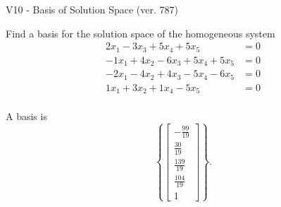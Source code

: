 \begin{exercise}
  \begin{exerciseTitle}V10 - Basis of Solution Space (ver. 787)\end{exerciseTitle}
  \begin{exerciseStatement}
    Find a basis for the solution space of the homogeneous system 
\begin{align*}
 2 x_ 1 -3 x_ 3 + 5 x_ 4 + 5 x_ 5 &= 0  \\ 
  -1 x_ 1 + 4 x_ 2 -6 x_ 3 + 5 x_ 4 + 5 x_ 5 &= 0  \\ 
  -2 x_ 1 -4 x_ 2 + 4 x_ 3 -5 x_ 4 -6 x_ 5 &= 0  \\ 
  1 x_ 1 + 3 x_ 2 + 1 x_ 4 -5 x_ 5 &= 0  \\ 
 \end{align*}


 
  \end{exerciseStatement}

  \begin{exerciseAnswer}
   A basis is   
\[\left\{\left[\begin{array}{c}
-\frac{99}{19} \\
\frac{30}{19} \\
\frac{139}{19} \\
\frac{104}{19} \\
1
\end{array}\right]\right\}.\]

  


  \end{exerciseAnswer}
\end{exercise}